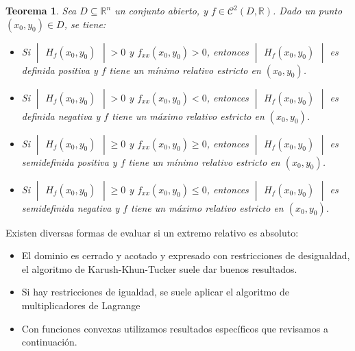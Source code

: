 \documentclass[a4paper,10pt]{article}
\newtheorem{theorem}{Teorema}
\begin{document}
\begin{theorem}
Sea $D\subseteq \mathbb{R}^n$ un conjunto abierto, y $f\in\mathcal{C}^2(D,\mathbb{R})$. Dado un punto $(x_0,y_0)\in D$, se tiene:
\begin{itemize}
    \item Si $\begin{vmatrix}H_f(x_0,y_0)\end{vmatrix}>0$ y $ f_{xx}(x_0,y_0)>0$, entonces $\begin{vmatrix}H_f(x_0,y_0)\end{vmatrix}$ es definida positiva
y $f$ tiene un mínimo relativo estricto en $(x_0, y_0)$.
    \item Si $\begin{vmatrix}H_f(x_0,y_0)\end{vmatrix}>0$ y $ f_{xx}(x_0,y_0)<0$, entonces $\begin{vmatrix}H_f(x_0,y_0)\end{vmatrix}$ es definida negativa
y $f$ tiene un máximo relativo estricto en $(x_0, y_0)$.
    \item Si $\begin{vmatrix}H_f(x_0,y_0)\end{vmatrix}\geq0$ y $ f_{xx}(x_0,y_0)\geq0$, entonces $\begin{vmatrix}H_f(x_0,y_0)\end{vmatrix}$ es semidefinida positiva
y $f$ tiene un mínimo relativo estricto en $(x_0, y_0)$.
  \item Si $\begin{vmatrix}H_f(x_0,y_0)\end{vmatrix}\geq0$ y $ f_{xx}(x_0,y_0)\leq0$, entonces $\begin{vmatrix}H_f(x_0,y_0)\end{vmatrix}$ es semidefinida negativa 
y $f$ tiene un máximo relativo estricto en $(x_0, y_0)$.
\end{itemize}

\end{theorem}
\noindent
Existen diversas formas de evaluar si un extremo relativo es absoluto:

\begin{itemize}
\item El dominio es cerrado y acotado y expresado con restricciones de desigualdad, el algoritmo de Karush-Khun-Tucker suele dar buenos resultados.
\item Si hay restricciones de igualdad, se suele aplicar el algoritmo de multiplicadores de Lagrange
\item Con funciones convexas utilizamos resultados específicos que revisamos a
continuación.

\end{itemize}
\end{document}
